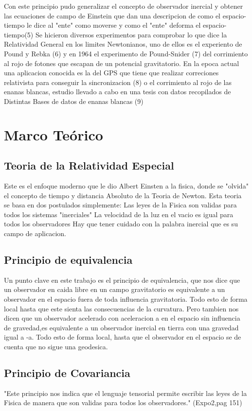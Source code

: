 \documentclass[12pt,twoside]{rif}
\begin{document}
Con este principio pudo generalizar el concepto de observador inercial y obtener las ecuaciones de campo de Einstein que dan
una descripcion de como el espacio-tiempo le dice al "ente" como moverse y como el "ente" deforma el espacio-tiempo(5)
Se hicieron diversos experimentos para comprobar lo que dice la Relatividad General en los limites Newtonianos, uno de ellos 
es el experiento de  Pound y Rebka (6) y en 1964 el experimento de Pound-Snider (7) del corrimiento al rojo de fotones que
escapan de un potencial gravitatorio.
En la epoca actual una aplicacion conocida es la del GPS que tiene que realizar correciones relativista para conseguir la 
sincronizacion (8) o el corrimiento al rojo de las enanas blancas, estudio llevado a cabo en una tesis con datos recopilados de 
Distintas Bases de datos de enanas blancas (9)
	\section{Marco Teórico}
	\subsection{Teoria de la Relatividad Especial}
	Este es el enfoque moderno que le dio Albert Einsten a la fisica, donde se "olvida" el concepto de tiempo y distancia Absoluto de la Teoria de Newton.
	Esta teoria se basa en dos postulados simplemente:
	Las leyes de la Fisica son validas para todos los sistemas "inerciales"
	 La velocidad de la luz en el vacio es igual para todos los observadores 
	Hay que tener cuidado con la palabra inercial que es su campo de aplicacion.
	\subsection{Principio de equivalencia}
	Un punto clave en este trabajo es el principio de equivalencia, que nos dice que un observador en caida libre en un campo gravitatorio es equivalente a un observador en el espacio fuera de toda influencia gravitatoria. Todo esto de forma local hasta que este sienta las consecuencias de la curvatura. Pero tambien nos dicen que un observador acelerado con aceleracion a en el espacio sin influencia de gravedad,es equivalente a un observador inercial en tierra con una gravedad igual a -a. Todo esto de forma local, hasta que el observador en el espacio se de cuenta que no sigue una geodesica.
	\subsection{Principio de Covariancia}
	"Este principio nos indica que el lenguaje tensorial permite escribir las leyes de la Fisica de manera que son validas para todos los observadores." (Expo2,pag 151)
\end{document}
